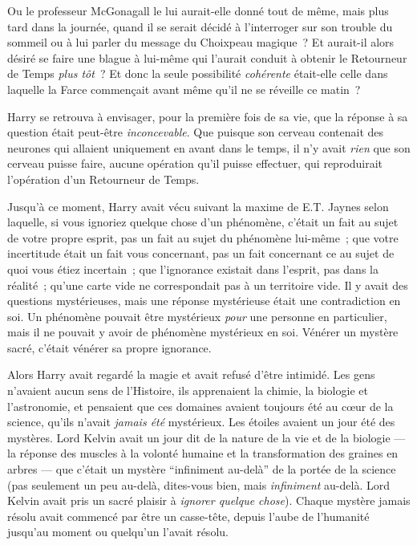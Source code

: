 Ou le professeur McGonagall le lui aurait-elle donné tout de même, mais plus tard dans la journée, quand il se serait décidé à l'interroger sur son trouble du sommeil ou à lui parler du message du Choixpeau magique~? Et aurait-il alors désiré se faire une blague à lui-même qui l'aurait conduit à obtenir le Retourneur de Temps \emph{plus tôt}~? Et donc la seule possibilité \emph{cohérente} était-elle celle dans laquelle la Farce commençait avant même qu'il ne se réveille ce matin~?

Harry se retrouva à envisager, pour la première fois de sa vie, que la réponse à sa question était peut-être \emph{inconcevable}. Que puisque son cerveau contenait des neurones qui allaient uniquement en avant dans le temps, il n'y avait \emph{rien} que son cerveau puisse faire, aucune opération qu'il puisse effectuer, qui reproduirait l'opération d'un Retourneur de Temps.

Jusqu'à ce moment, Harry avait vécu suivant la maxime de E.T. Jaynes selon laquelle, si vous ignoriez quelque chose d'un phénomène, c'était un fait au sujet de votre propre esprit, pas un fait au sujet du phénomène lui-même~; que votre incertitude était un fait vous concernant, pas un fait concernant ce au sujet de quoi vous étiez incertain~; que l'ignorance existait dans l'esprit, pas dans la réalité~; qu'une carte vide ne correspondait pas à un territoire vide. Il y avait des questions mystérieuses, mais une réponse mystérieuse était une contradiction en soi. Un phénomène pouvait être mystérieux \emph{pour} une personne en particulier, mais il ne pouvait y avoir de phénomène mystérieux en soi. Vénérer un mystère sacré, c'était vénérer sa propre ignorance.

Alors Harry avait regardé la magie et avait refusé d'être intimidé. Les gens n'avaient aucun sens de l'Histoire, ils apprenaient la chimie, la biologie et l'astronomie, et pensaient que ces domaines avaient toujours été au cœur de la science, qu'ils n'avait \emph{jamais été} mystérieux. Les étoiles avaient un jour été des mystères. Lord Kelvin avait un jour dit de la nature de la vie et de la biologie — la réponse des muscles à la volonté humaine et la transformation des graines en arbres — que c'était un mystère “infiniment au-delà” de la portée de la science (pas seulement un peu au-delà, dites-vous bien, mais \emph{infiniment} au-delà. Lord Kelvin avait pris un sacré plaisir à \emph{ignorer quelque chose}). Chaque mystère jamais résolu avait commencé par être un casse-tête, depuis l'aube de l'humanité jusqu'au moment ou quelqu'un l'avait résolu.

